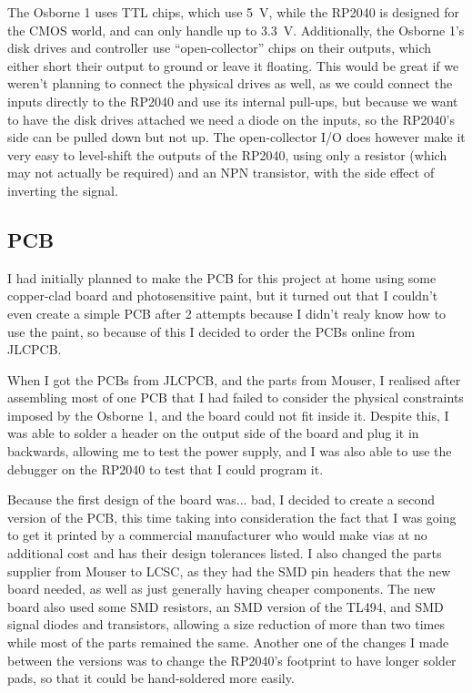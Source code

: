 \documentclass[a4paper]{article}
\begin{document}
The Osborne 1 uses TTL chips, which use \qty{5}{\V}, while the RP2040
is designed for the CMOS world, and can only handle up to
\qty{3.3}{\V}. Additionally, the Osborne 1's disk drives and
controller use ``open-collector'' chips on their outputs, which either
short their output to ground or leave it floating. This would be great
if we weren't planning to connect the physical drives as well, as we
could connect the inputs directly to the RP2040 and use its internal
pull-ups, but because we want to have the disk drives attached we need
a diode on the inputs, so the RP2040's side can be pulled down but not
up. The open-collector I/O does however make it very easy to
level-shift the outputs of the RP2040, using only a resistor (which
may not actually be required) and an NPN transistor, with the side
effect of inverting the signal.

\subsection{PCB}

I had initially planned to make the PCB for this project at home using
some copper-clad board and photosensitive paint, but it turned out
that I couldn't even create a simple PCB after 2 attempts because I
didn't realy know how to use the paint, so because of this I decided
to order the PCBs online from JLCPCB.

When I got the PCBs from JLCPCB, and the parts from Mouser, I realised
after assembling most of one PCB that I had failed to consider the
physical constraints imposed by the Osborne 1, and the board could not
fit inside it. Despite this, I was able to solder a header on the
output side of the board and plug it in backwards, allowing me to test
the power supply, and I was also able to use the debugger on the
RP2040 to test that I could program it.

Because the first design of the board was... bad, I decided to create
a second version of the PCB, this time taking into consideration the
fact that I was going to get it printed by a commercial manufacturer
who would make vias at no additional cost and has their design
tolerances listed. I also changed the parts supplier from Mouser to
LCSC, as they had the SMD pin headers that the new board needed, as
well as just generally having cheaper components. The new board also
used some SMD resistors, an SMD version of the TL494, and SMD signal
diodes and transistors, allowing a size reduction of more than two
times while most of the parts remained the same. Another one of the
changes I made between the versions was to change the RP2040's
footprint to have longer solder pads, so that it could be
hand-soldered more easily.
\end{document}
